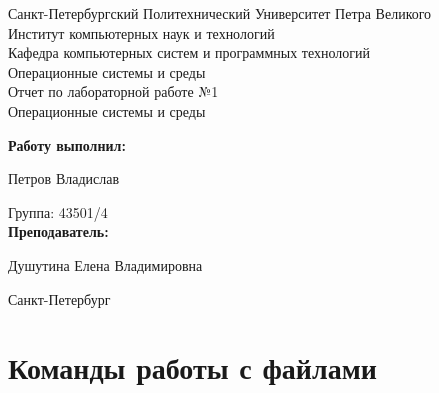 \documentclass[a4paper]{article}
\begin{document}
\begin{titlepage} %

\begin{center} %

\large Санкт-Петербургский Политехнический Университет Петра Великого\\
\large Институт компьютерных наук и технологий \\
\large Кафедра компьютерных систем и программных технологий\\[6cm]

\huge Операционные системы и среды\\[0.5cm] %
\large Отчет по лабораторной работе №1\\[0.1cm]
\large Операционные системы и среды\\[5cm]
\end{center}

\begin{flushright}
\begin{minipage}{0.5\textwidth}
\begin{flushright}
\textbf{Работу выполнил:}

Петров Владислав

{Группа:} 43501/4\\


\textbf{Преподаватель:} 

Душутина Елена Владимировна
\end{flushright}
\end{minipage} %
\end{flushright} %

\vfill %

\begin{center}

\large Санкт-Петербург\\
\large \the\year %

\end{center} %

\thispagestyle{empty} %
\end{titlepage} %

\vfill %

\section{Команды работы с файлами}
\end{document}
